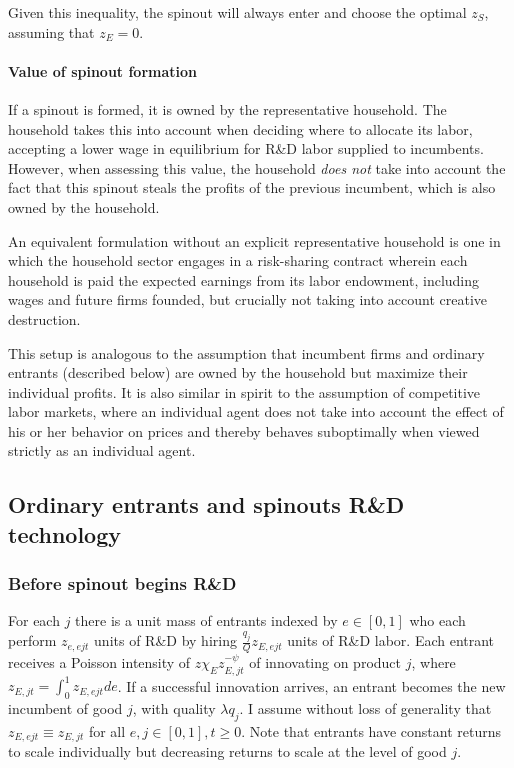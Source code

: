 \documentclass[12pt,english]{article}
\theoremstyle{remark}
\begin{document}
Given this inequality, the spinout will always enter and choose the optimal $z_S$, assuming that $z_E = 0$. 


\paragraph{Value of spinout formation}

If a spinout is formed, it is owned by the representative household. The household takes this into account when deciding where to allocate its labor, accepting a lower wage in equilibrium for R\&D labor supplied to incumbents. However, when assessing this value, the household \textit{does not} take into account the fact that this spinout steals the profits of the previous incumbent, which is also owned by the household. 

An equivalent formulation without an explicit representative household is one in which the household sector engages in a risk-sharing contract wherein each household is paid the expected earnings from its labor endowment, including wages and future firms founded, but crucially not taking into account creative destruction.  

This setup is analogous to the assumption that incumbent firms and ordinary entrants (described below) are owned by the household but maximize their individual profits. It is also similar in spirit to the assumption of competitive labor markets, where an individual agent does not take into account the effect of his or her behavior on prices and thereby behaves suboptimally when viewed strictly as an individual agent. 


\subsection{Ordinary entrants and spinouts R\&D technology}\label{subsec_ordinaryEntrants}

\subsubsection{Before spinout begins R\&D}

For each $j$ there is a unit mass of entrants indexed by $e \in [0,1]$ who each perform $z_{e,ejt}$ units of R\&D by hiring $\frac{q_j}{Q} z_{E,ejt}$ units of R\&D labor. Each entrant receives a Poisson intensity of $z \chi_E z_{E,jt}^{-\psi}$ of innovating on product $j$, where $z_{E,jt} = \int_0^1 z_{E,ejt} de$. If a successful innovation arrives, an entrant becomes the new incumbent of good $j$, with quality $\lambda q_j$. I assume without loss of generality that $z_{E,ejt} \equiv z_{E,jt}$ for all $e,j \in [0,1], t \ge 0$. Note that entrants have constant returns to scale individually but decreasing returns to scale at the level of good $j$.
\end{document}
